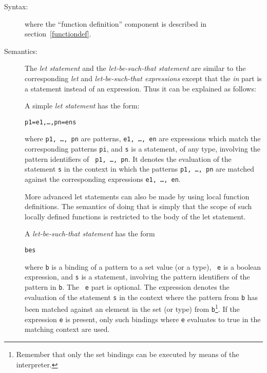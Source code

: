 \documentclass[\pformat,12pt]{article}
\begin{document}
\begin{description}
\item[Syntax:]





  where the ``function definition'' component is described in
  section~\ref{functiondef}.

\item[Semantics:] The {\it let statement} and the {\it let-be-such-that
    statement} are similar to the corresponding {\it let} and {\it
    let-be-such-that expressions} except that the {\it in} part is a
  statement instead of an expression. Thus it can be explained as follows:

  A simple {\it let statement} has the form:
  \begin{alltt}
     p1 = e1, \ldots, pn = en  s
  \end{alltt}
  where {\tt p1, \ldots, pn} are patterns, {\tt e1, \ldots, en} are
  expressions which match the corresponding patterns {\tt pi}, and {\tt s}
  is a statement, of any type, involving the pattern identifiers of {\tt
    p1, \ldots, pn}. It denotes the evaluation of the statement {\tt s} in
  the context in which the patterns {\tt p1, \ldots, pn} are matched
  against the corresponding expressions {\tt e1, \ldots, en}.

  More advanced let statements can also be made by using local function
  definitions. The semantics of doing that is simply that the scope of such
  locally defined functions is restricted to the body of the let statement.


  A {\it let-be-such-that statement} has the form
  \begin{alltt}
     b  e  s
  \end{alltt}
  where {\tt b} is a binding of a pattern to a set value (or a type), {\tt
    e} is a boolean expression, and {\tt s} is a statement, involving the
  pattern identifiers of the pattern in {\tt b}. The {\tt {} e}
  part is optional. The expression denotes the evaluation of the statement
  {\tt s} in the context where the pattern from {\tt b} has been matched
  against an element in the set (or type) from {\tt b}\footnote{Remember
    that only the set bindings can be executed by means of the
    interpreter.}. 
  If the 
  expression {\tt e} is present, only such bindings where {\tt e} evaluates
  to true in the matching context are used.
     

\end{description}
\end{document}
